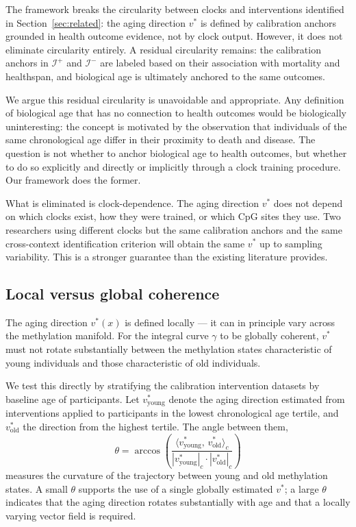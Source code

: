 The framework breaks the circularity between clocks and interventions identified
in Section~\ref{sec:related}: the aging direction $v^*$ is defined by calibration
anchors grounded in health outcome evidence, not by clock output. However, it does
not eliminate circularity entirely. A residual circularity remains: the calibration
anchors in $\mathcal{I}^+$ and $\mathcal{I}^-$ are labeled based on their
association with mortality and healthspan, and biological age is ultimately anchored
to the same outcomes.

We argue this residual circularity is unavoidable and appropriate. Any definition
of biological age that has no connection to health outcomes would be biologically
uninteresting: the concept is motivated by the observation that individuals of the
same chronological age differ in their proximity to death and disease. The question
is not whether to anchor biological age to health outcomes, but whether to do so
explicitly and directly or implicitly through a clock training procedure. Our
framework does the former.

What is eliminated is clock-dependence. The aging direction $v^*$ does not depend
on which clocks exist, how they were trained, or which CpG sites they use. Two
researchers using different clocks but the same calibration anchors and the same
cross-context identification criterion will obtain the same $v^*$ up to sampling
variability. This is a stronger guarantee than the existing literature provides.

\subsection{Local versus global coherence}
\label{sec:coherence}

The aging direction $v^*(x)$ is defined locally --- it can in principle vary across
the methylation manifold. For the integral curve $\gamma$ to be globally coherent,
$v^*$ must not rotate substantially between the methylation states characteristic
of young individuals and those characteristic of old individuals.

We test this directly by stratifying the calibration intervention datasets by
baseline age of participants. Let $v^*_{\text{young}}$ denote the aging direction
estimated from interventions applied to participants in the lowest chronological
age tertile, and $v^*_{\text{old}}$ the direction from the highest tertile. The
angle between them,
\begin{equation}
  \theta = \arccos\!\left(
    \frac{\langle v^*_{\text{young}},\, v^*_{\text{old}} \rangle_c}
         {|v^*_{\text{young}}|_c \cdot |v^*_{\text{old}}|_c}
  \right)
  \label{eq:curvature}
\end{equation}
measures the curvature of the trajectory between young and old methylation states.
A small $\theta$ supports the use of a single globally estimated $v^*$; a large
$\theta$ indicates that the aging direction rotates substantially with age and that
a locally varying vector field is required.

